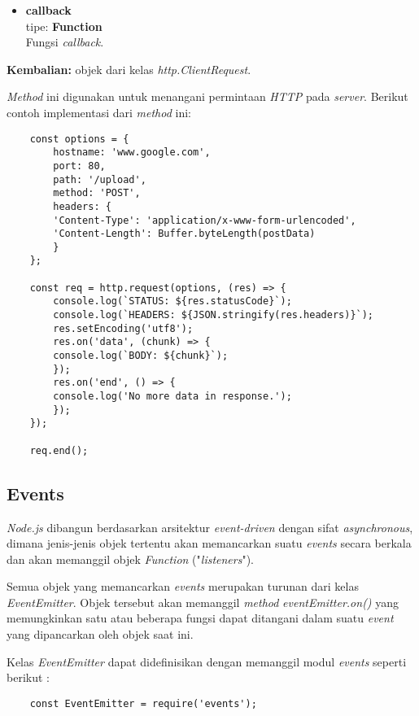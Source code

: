 \begin{itemize}
\begin{itemize}
		\item \textbf{callback} \\tipe: \textbf{Function} \\ Fungsi \textit{callback}.
	\end{itemize}

	\textbf{Kembalian:} objek dari kelas \textit{http.ClientRequest}.
	
	\textit{Method} ini digunakan untuk menangani permintaan \textit{HTTP} pada \textit{server}. Berikut contoh implementasi dari \textit{method} ini:
	\begin{lstlisting}
	const options = {
		hostname: 'www.google.com',
		port: 80,
		path: '/upload',
		method: 'POST',
		headers: {
		'Content-Type': 'application/x-www-form-urlencoded',
		'Content-Length': Buffer.byteLength(postData)
		}
	};
	
	const req = http.request(options, (res) => {
		console.log(`STATUS: ${res.statusCode}`);
		console.log(`HEADERS: ${JSON.stringify(res.headers)}`);
		res.setEncoding('utf8');
		res.on('data', (chunk) => {
		console.log(`BODY: ${chunk}`);
		});
		res.on('end', () => {
		console.log('No more data in response.');
		});
	});
	
	req.end();
	\end{lstlisting}
	
\end{itemize}

\subsection{Events}
\textit{Node.js} dibangun berdasarkan arsitektur \textit{event-driven} dengan sifat \textit{asynchronous}, dimana jenis-jenis objek tertentu akan memancarkan suatu \textit{events} secara berkala dan akan memanggil objek \textit{Function} ("\textit{listeners}").

Semua objek yang memancarkan \textit{events} merupakan turunan dari kelas \textit{EventEmitter}. Objek tersebut akan memanggil \textit{method} \textit{eventEmitter.on()} yang memungkinkan satu atau beberapa fungsi dapat ditangani dalam suatu \textit{event} yang dipancarkan oleh objek saat ini.

Kelas \textit{EventEmitter} dapat didefinisikan dengan memanggil modul \textit{events} seperti berikut :

\begin{lstlisting}
	const EventEmitter = require('events');
\end{lstlisting}

